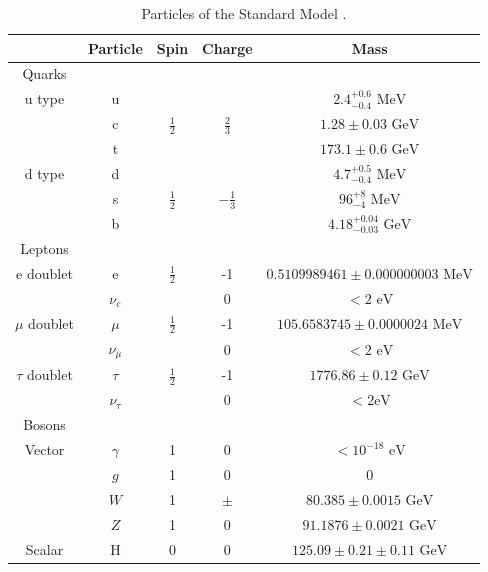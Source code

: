 \begin{table}[h]
\begin{center}
\footnotesize
\begin{tabular}[h]{|c||c|c|c|c|}
\hline
 & Particle & Spin & Charge & Mass \\
\hline\hline
Quarks &&&&\\
\hline
u type &u& & &${2.4^{+0.6}_{-0.4} \text{ MeV}}$\\
 &c&${\frac{1}{2}}$&${\frac{2}{3}}$&${1.28\pm{0.03} \text{ GeV}}$\\
 &t& & &${173.1\pm{0.6} \text{ GeV}}$\\
\hline
d type & d& & & ${4.7^{+0.5}_{-0.4} \text{ MeV}}$\\
 & s & ${\frac{1}{2}}$ & ${-\frac{1}{3}}$ & ${96^{+8}_{-4} \text{ MeV}}$\\
 & b & & & ${4.18^{+0.04}_{-0.03} \text{ GeV}}$\\
\hline\hline
Leptons &&&&\\
\hline
e doublet & e & ${\frac{1}{2}}$ & -1 &${0.5109989461\pm{}0.000000003 \text{ MeV}}$\\
 & ${\nu_{e}}$ & & 0 & ${< 2 \text{ eV}}$\\
 \hline
${\mu}$ doublet & ${\mu}$ & ${\frac{1}{2}}$ & -1 &${105.6583745\pm{}0.0000024 \text{ MeV}}$\\
 & ${\nu_{\mu}}$ & & 0 & ${< 2 \text{ eV}}$\\
 \hline
${\tau}$ doublet & ${\tau}$ & ${\frac{1}{2}}$ & -1 &${1776.86\pm{}0.12 \text{ GeV}}$\\
 & ${\nu_{\tau}}$ & & 0 & ${< 2 \text{eV}}$\\
 \hline\hline
 Bosons &&&&\\
 \hline
 Vector & ${\gamma}$ & 1 & 0 & ${< 10^{-18} \text{ eV}}$\\
 & ${g}$ & 1 & 0 & ${0}$\\
 & ${W}$ & 1 & ${\pm}$ & ${80.385\pm{}0.0015 \text{ GeV}}$\\
 & ${Z}$ & 1 & 0 & ${91.1876\pm{}0.0021 \text{ GeV}}$\\
 \hline
 Scalar & H & 0& 0 & ${125.09\pm{}0.21\pm{}0.11 \text{ GeV}}$\\
 \hline
\end{tabular}
\caption[Particles of the Standard Model.]{Particles of the Standard Model \cite{PDG2018}.}
\label{tab:SM}
\end{center}
\end{table}


